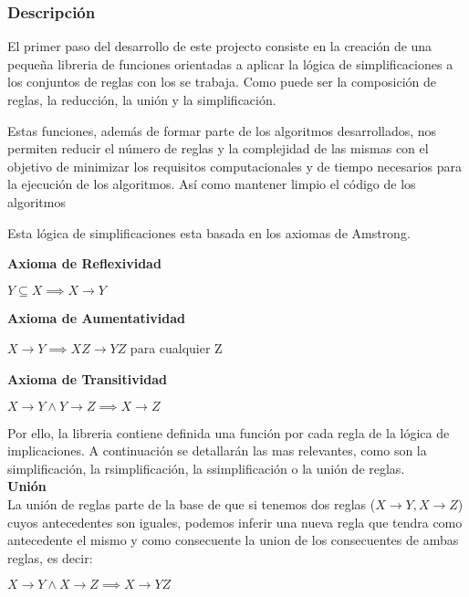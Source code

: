 \subsubsection{Descripci\'on} 

El primer paso del desarrollo de este projecto consiste en la creaci\'on de una peque\~na libreria de funciones
orientadas a aplicar la l\'ogica de simplificaciones a los conjuntos de reglas con los se trabaja. Como 
puede ser la composici\'on de reglas, la reducci\'on, la uni\'on y la simplificaci\'on.

Estas funciones, adem\'as de formar parte de los algoritmos desarrollados, nos permiten reducir el n\'umero de 
reglas y la complejidad de las mismas con el objetivo de minimizar los requisitos computacionales y de tiempo
necesarios para la ejecuci\'on de los algoritmos. As\'i como mantener limpio el c\'odigo de los algoritmos

Esta l\'ogica de simplificaciones esta basada en los axiomas de Amstrong.

\textbf{Axioma de Reflexividad}

\begin{center}
    \(Y \subseteq X \implies X \to Y \)
\end{center}

\textbf{Axioma de Aumentatividad}

\begin{center}
    \(X \to Y \implies XZ \to YZ \) para cualquier Z
\end{center}

\textbf{Axioma de Transitividad}

\begin{center}
    \(X \to Y \wedge Y \to Z \implies X \to Z \)
\end{center}

Por ello, la libreria contiene definida una funci\'on por cada regla de la l\'ogica de implicaciones. A continuaci\'on se detallar\'an las mas relevantes, como son la simplificaci\'on, la rsimplificaci\'on, la ssimplificaci\'on o la uni\'on de reglas.\\

\textbf{Uni\'on}\\
La uni\'on de reglas parte de la base de que si tenemos dos reglas (\(X \to Y , X \to Z\)) cuyos antecedentes son iguales, podemos inferir una nueva regla que tendra como antecedente el mismo y como consecuente la union de los consecuentes de ambas reglas, es decir:

\begin{center}
    \(X \to Y \wedge X \to Z \implies X \to YZ \)
\end{center}

